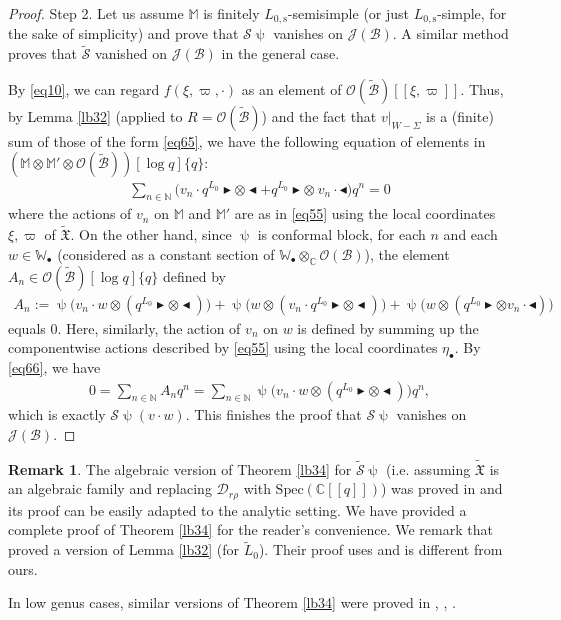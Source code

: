 \documentclass[12pt,a4paper,notitlepage]{article}
\theoremstyle{definition}
\newtheorem{rem}[df]{Remark}
\theoremstyle{plain}
\newcommand{\fk}{\mathfrak}
\newcommand{\mc}{\mathcal}
\newcommand{\wtd}{\widetilde}
\newcommand{\scr}{\mathscr}
\newcommand{\blt}{\bullet}
\newcommand{\Wbb}{\mathbb W}
\newcommand{\Mbb}{\mathbb M}
\newcommand{\Cbb}{\mathbb C}
\newcommand{\Nbb}{\mathbb N}
\newcommand{\btl}{\blacktriangleleft}
\newcommand{\btr}{\blacktriangleright}
\newcommand{\Lss}{{L_{0,\mathrm{s}}}}
\numberwithin{equation}{section}
\begin{document}
\begin{proof}
	
Step 2. Let us assume $\Mbb$ is finitely $\Lss$-semisimple (or just $\Lss$-simple, for the sake of simplicity) and prove that $\mc S\uppsi$ vanishes on $\scr J(\mc B)$. A similar method proves that $\wtd{\mc S}$ vanished on $\scr J(\mc B)$ in  the general case. 

By \eqref{eq10}, we can regard $f(\xi,\varpi,\cdot)$ as an element of $\scr O(\wtd{\mc B})[[\xi,\varpi]]$. Thus, by Lemma \ref{lb32} (applied to $R=\scr O(\wtd{\mc B})$) and the fact that $v|_{W-\Sigma}$ is a (finite) sum of those of the form \eqref{eq65}, we have the following equation of elements in $(\Mbb\otimes\Mbb'\otimes \scr O(\wtd{\mc B}))[\log q]\{q\}$:
	\begin{align}
	\sum_{n\in\Nbb}\big(v_{n}\cdot q^{L_0}\btr\otimes\btl+ q^{L_0}\btr\otimes~ v_{n}\cdot\btl\big)q^{n} =0\label{eq66}
	\end{align}
	where the actions of $v_{n}$ on $\Mbb$ and $\Mbb'$ are as in \eqref{eq55} using the  local coordinates $\xi,\varpi$ of $\wtd{\fk X}$. On the other hand, since $\uppsi$ is  conformal block, for each $n$ and each $w\in\Wbb_\blt$ (considered as a constant section of $\Wbb_\blt\otimes_\Cbb\scr O(\mc B)$), the element $A_{n}\in\scr O(\wtd{\mc B})[\log q]\{q\}$ defined by
	\begin{align*}
	A_{n}:=\uppsi\big(v_{n}\cdot w\otimes (q^{L_0}\btr\otimes\btl)\big)+\uppsi\big(w\otimes (v_n\cdot q^{L_0}\btr\otimes\btl)\big)+\uppsi\big(w\otimes ( q^{L_0}\btr\otimes v_n\cdot\btl)\big)
	\end{align*}
	equals $0$. Here, similarly, the action of $v_{n}$ on $w$ is defined by summing up the componentwise actions described by \eqref{eq55} using the local coordinates $\eta_\blt$.  By \eqref{eq66}, we have
	\begin{align*}
	0=\sum_{n\in\Nbb}A_{n}q^{n}=\sum_{n\in\Nbb}\uppsi\big(v_{n}\cdot w\otimes (q^{L_0}\btr\otimes\btl)\big)q^n,
	\end{align*}
	which is exactly $\mc S\uppsi(v\cdot w)$. This finishes the proof that $\mc S\uppsi$ vanishes on $\scr J(\mc B)$.
\end{proof}



\begin{rem}
The algebraic version of  Theorem \ref{lb34} for $\wtd{\mc S}\uppsi$ (i.e. assuming $\wtd{\fk X}$ is an algebraic family and replacing $\mc D_{r\rho}$ with $\mathrm{Spec}(\Cbb[[q]])$) was proved in \cite[Thm. 8.5.1]{DGT19b} and its proof can be easily adapted to the analytic setting. We have provided a complete proof of Theorem \ref{lb34} for the reader's convenience. We remark that \cite{DGT19b}  proved a version of Lemma \ref{lb32} (for $\wtd L_0$). Their proof uses \cite[Lemma 8.7.1]{NT05} and is different from ours.

In low genus cases, similar versions of Theorem \ref{lb34} were proved in \cite[Prop. 4.3.6]{Zhu96}, \cite[Thm. 1.4]{Hua05a}, \cite[Prop. 3.6]{Hua05b}.
\end{rem}
\end{document}
